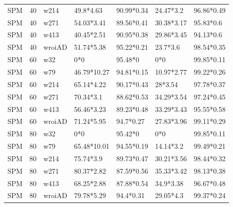 \begin{table}[ht]
\begin{tabular}{lllllll}
  SPM & 40 & w214 & 49.8*4.63 & 90.99*0.34 & 24.47*3.2 & 96.86*0.49 \\ 
  SPM & 40 & w271 & 54.03*3.41 & 89.56*0.41 & 30.38*3.17 & 95.83*0.6 \\ 
  SPM & 40 & w413 & 40.45*2.51 & 90.95*0.38 & 29.86*3.45 & 94.13*0.6 \\ 
  SPM & 40 & wroiAD & 51.74*5.38 & 95.22*0.21 & 23.7*3.6 & 98.54*0.35 \\ 
  SPM & 60 & w32 & 0*0 & 95.48*0 & 0*0 & 99.85*0.11 \\ 
  SPM & 60 & w79 & 46.79*10.27 & 94.81*0.15 & 10.97*2.77 & 99.22*0.26 \\ 
  SPM & 60 & w214 & 65.14*4.22 & 90.17*0.43 & 28*3.54 & 97.78*0.37 \\ 
  SPM & 60 & w271 & 70.34*3.1 & 88.62*0.53 & 34.29*3.54 & 97.24*0.45 \\ 
  SPM & 60 & w413 & 56.46*3.23 & 89.23*0.48 & 33.29*3.43 & 95.55*0.58 \\ 
  SPM & 60 & wroiAD & 71.24*5.95 & 94.7*0.27 & 27.83*3.96 & 99.11*0.29 \\ 
  SPM & 80 & w32 & 0*0 & 95.42*0 & 0*0 & 99.85*0.11 \\ 
  SPM & 80 & w79 & 65.48*10.01 & 94.55*0.19 & 14.14*3.2 & 99.49*0.21 \\ 
  SPM & 80 & w214 & 75.74*3.9 & 89.73*0.47 & 30.21*3.56 & 98.44*0.32 \\ 
  SPM & 80 & w271 & 80.37*2.82 & 87.59*0.56 & 35.33*3.42 & 98.13*0.38 \\ 
  SPM & 80 & w413 & 68.25*2.88 & 87.88*0.54 & 34.9*3.38 & 96.67*0.48 \\ 
  SPM & 80 & wroiAD & 79.78*5.29 & 94.4*0.31 & 29.05*4.3 & 99.37*0.24 \\ 
   \hline
\end{tabular}
\end{table}


